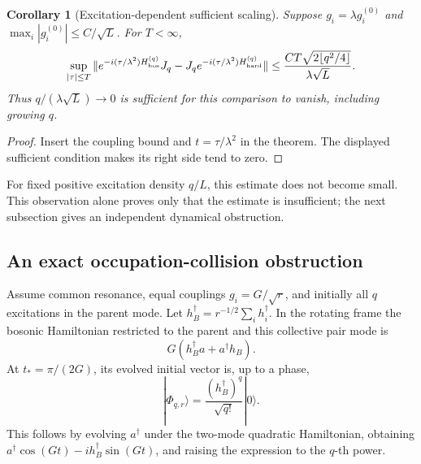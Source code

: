 \documentclass[11pt]{article}
\newtheorem{corollary}[theorem]{Corollary}
\theoremstyle{remark}
\begin{document}
\begin{corollary}[Excitation-dependent sufficient scaling]
\label{cor:v20v58-scaling}
Suppose \(g_i=\lambda g_i^{(0)}\) and
\(\max_i|g_i^{(0)}|\leq C/\sqrt L\).  For \(T<\infty\),
\[
 \sup_{|\tau|\leq T}
 \|e^{-i(\tau/\lambda^2)H_{\rm bos}^{(q)}}J_q
       -J_qe^{-i(\tau/\lambda^2)H_{\rm hard}^{(q)}}\|
 \leq\frac{CT\sqrt{2\lfloor q^2/4\rfloor}}{\lambda\sqrt L}.
\]
Thus \(q/(\lambda\sqrt L)\to0\) is sufficient for this
comparison to vanish, including growing \(q\).
\end{corollary}
\begin{proof}
Insert the coupling bound and \(t=\tau/\lambda^2\) in
the theorem.  The displayed sufficient condition makes
its right side tend to zero.
\end{proof}

For fixed positive excitation density \(q/L\), this estimate
does not become small.  This observation alone proves only
that the estimate is insufficient; the next subsection
gives an independent dynamical obstruction.

\subsection{An exact occupation-collision obstruction}

Assume common resonance, equal couplings \(g_i=G/\sqrt r\),
and initially all \(q\) excitations in the parent mode.
Let \(h_B^\dagger=r^{-1/2}\sum_i h_i^\dagger\).
In the rotating frame the bosonic Hamiltonian restricted
to the parent and this collective pair mode is
\[
 G(h_B^\dagger a+a^\dagger h_B).
\]
At \(t_*=\pi/(2G)\), its evolved initial vector is, up to
a phase,
\[
 |\Phi_{q,r}\rangle=\frac{(h_B^\dagger)^q}{\sqrt{q!}}|0\rangle .
\]
This follows by evolving \(a^\dagger\) under the two-mode
quadratic Hamiltonian, obtaining
\(a^\dagger\cos(Gt)-ih_B^\dagger\sin(Gt)\), and raising
the expression to the \(q\)-th power.
\end{document}
